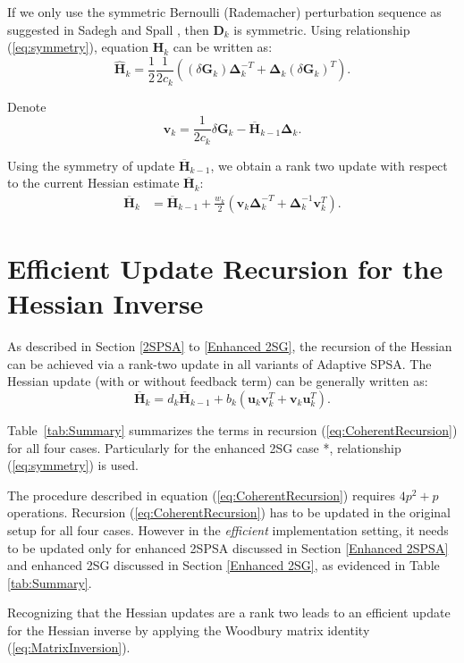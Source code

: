 \documentclass[conference]{IEEEtran}
\newcommand{\bD}{\bm{D}}
\newcommand{\bG}{\bm{G}}
\newcommand{\bDelta}{\bm{\Delta}}
\newcommand{\oH}{\bm{\overline{H}}}
\newcommand{\hH}{\bm{\hat{H}}}
\begin{document}
	If we only use the symmetric Bernoulli (Rademacher) perturbation sequence as
	suggested in Sadegh and Spall \cite{Sadegh1998}, then $\bD_k$ is
	symmetric. Using relationship (\ref{eq:symmetry}), equation
	$\hH_k$ can be written as:
	\begin{equation}
		\hH_k=\frac{1}{2}\frac{1}{2c_k}\left( (\delta\bG_k)\bDelta_k^{-T}+\bDelta_k(\delta\bG_k)^{T} \right).
	\end{equation}
		
	Denote
	\begin{equation}
		\bm{v}_k= \frac{1}{2c_k}\delta\bG_k-\oH_{k-1}\bDelta_k.
	\end{equation}
		
	Using the symmetry of update $\oH_{k-1}$, we obtain a rank two update with respect to the current Hessian estimate $\oH_k$:
	\begin{align*}
		\oH_k&=\oH_{k-1}+\frac{w_k}{2} (\bm{v}_k\bDelta_k^{-T}+\bDelta_k^{-1}\bm{v}_k^{T}).
	\end{align*}
		
	
	\section{Efficient Update Recursion for the Hessian Inverse}
	As described in Section \ref{2SPSA} to \ref{Enhanced 2SG}, the
	recursion of the Hessian can be achieved via a rank-two update in all
	variants of Adaptive SPSA.
	The Hessian update (with or without feedback term) can be
	generally written as:
	\begin{equation} \label{eq:CoherentRecursion}
		\oH_{k}=d_k\oH_{k-1}+b_k(\bm{u}_k \bm{v}_k^{T}+\bm{v}_k \bm{u}_k^{T}).
	\end{equation}
	
	Table~\ref{tab:Summary} summarizes the terms in recursion
	(\ref{eq:CoherentRecursion}) for all four cases. Particularly for the enhanced 2SG case *, relationship (\ref{eq:symmetry}) is used.
	
	The procedure described in equation (\ref{eq:CoherentRecursion}) requires $4p^2 + p$ operations. Recursion (\ref{eq:CoherentRecursion}) has to be updated in the original setup for all four cases. However in the \textit{efficient} implementation setting, it needs to be updated only for enhanced 2SPSA discussed in Section \ref{Enhanced 2SPSA} and enhanced 2SG discussed in Section \ref{Enhanced 2SG}, as evidenced in Table \ref{tab:Summary}.
	
	Recognizing that the Hessian updates are a rank two leads to an
	efficient update for the Hessian inverse by applying the
	Woodbury matrix identity (\ref{eq:MatrixInversion}).
	
\end{document}
